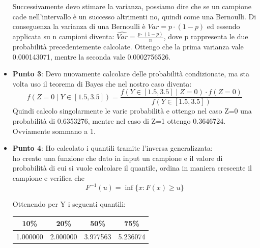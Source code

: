 \documentclass[a4paper,12pt]{article}
\begin{document}
\begin{itemize}
	Successivamente devo stimare la varianza, possiamo dire che se un campione cade nell'intervallo è un successo altrimenti no, quindi come una Bernoulli. Di conseguenza la varianza di una Bernoulli è $Var = p \cdot(1-p)$ ed essendo applicata su n campioni diventa: $\hat{Var} =\frac{p \cdot(1-p)}{n}  $, dove p rappresenta le due probabilità precedentemente calcolate. Ottengo che la prima varianza vale 0.000143071, mentre la seconda vale 0.0002756526.
	\item \textbf{Punto 3}: Devo nuovamente calcolare delle probabilità condizionate, ma sta volta uso il teorema di Bayes che nel nostro caso diventa:\\
	\[
	f(Z = 0 \mid Y \in [1.5, 3.5])=\frac{f(Y \in [1.5, 3.5] \mid Z = 0 ) \cdot f(Z = 0)}{f(Y \in [1.5, 3.5])}
	\]
	Quindi calcolo singolarmente le varie probabilità e ottengo nel caso Z=0 una probabilità di 0.6353276, mentre nel caso di Z=1 ottengo 0.3646724. Ovviamente sommano a 1.
	\item \textbf{Punto 4}: Ho calcolato i quantili tramite l'inversa generalizzata: \\
	ho creato una funzione che dato in input un campione e il valore di probabilità di cui si vuole calcolare il quantile, ordina in maniera crescente il campione e verifica che\\
	\[
	F^{-1}(u) = \inf \{ x : F(x) \geq u \}
	\]
	
	Ottenendo per Y i seguenti quantili:\\
	
	\begin{tabular}{|c|c|c|c|}
		\hline
		10\% & 20\% & 50\% & 75\% \\
		\hline
		1.000000 & 2.000000 & 3.977563 & 5.236074 \\
		\hline
	\end{tabular}\\
	

\end{itemize}
\end{document}
